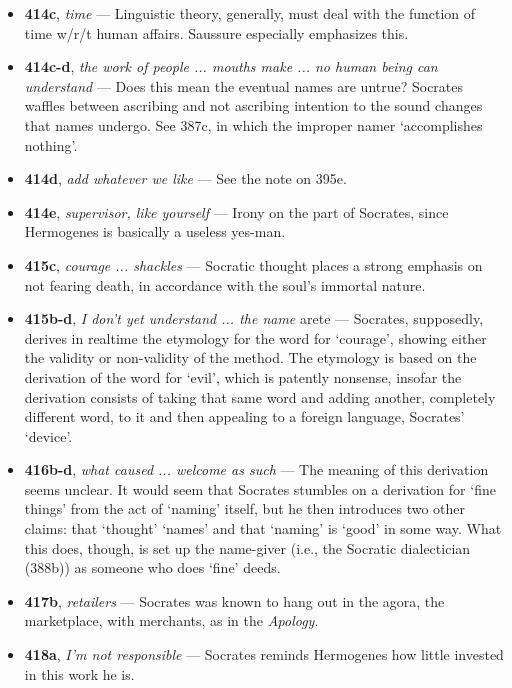 \documentclass[12pt]{article}
\begin{document}
\begin{itemize}
\item \textbf{414c}, \textit{time} --- Linguistic theory, generally, must deal with the function of time w/r/t human affairs. Saussure especially emphasizes this.

\item \textbf{414c-d}, \textit{the work of people ... mouths make ... no human being can understand} --- Does this mean the eventual names are untrue? Socrates waffles between ascribing and not ascribing intention to the sound changes that names undergo. See 387c, in which the improper namer `accomplishes nothing'.

\item \textbf{414d}, \textit{add whatever we like} --- See the note on 395e.

\item \textbf{414e}, \textit{supervisor, like yourself} --- Irony on the part of Socrates, since Hermogenes is basically a useless yes-man.

\item \textbf{415c}, \textit{courage ... shackles} --- Socratic thought places a strong emphasis on not fearing death, in accordance with the soul's immortal nature.

\item \textbf{415b-d}, \textit{I don't yet understand ... the name} arete --- Socrates, supposedly, derives in realtime the etymology for the word for `courage', showing either the validity or non-validity of the method. The etymology is based on the derivation of the word for `evil', which is patently nonsense, insofar the derivation consists of taking that same word and adding another, completely different word, to it and then appealing to a foreign language, Socrates' `device'.

\item \textbf{416b-d}, \textit{what caused ... welcome as such} --- The meaning of this derivation seems unclear. It would seem that Socrates stumbles on a derivation for `fine things' from the act of `naming' itself, but he then introduces two other claims: that `thought' `names' and that `naming' is `good' in some way. What this does, though, is set up the name-giver (i.e., the Socratic dialectician (388b)) as someone who does `fine' deeds.

\item \textbf{417b}, \textit{retailers} --- Socrates was known to hang out in the agora, the marketplace, with merchants, as in the \textit{Apology}.

\item \textbf{418a}, \textit{I'm not responsible} --- Socrates reminds Hermogenes how little invested in this work he is.


\end{itemize}
\end{document}
